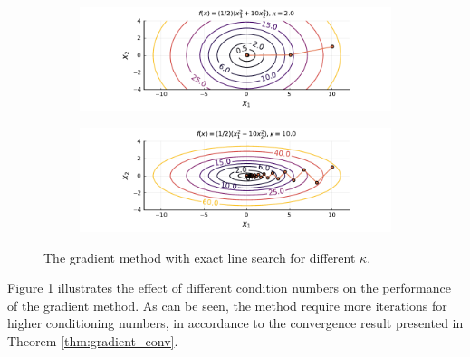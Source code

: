 \begin{figure}[h]
\begin{subfigure}[b]{\textwidth}
    \centering
   \includegraphics[width=\textwidth]{part_2/chapter_6/figures/gradient_k2.pdf}
\end{subfigure}
\hfill
\begin{subfigure}[b]{\textwidth}
    \centering
   \includegraphics[width=\textwidth]{part_2/chapter_6/figures/gradient_k10.pdf}
\end{subfigure}
\caption{The gradient method with exact line search for different $\kappa$.}\label{fig:figure_5}
\end{figure}



Figure \ref{fig:figure_5} illustrates the effect of different condition numbers on the performance of the gradient method. As can be seen, the method require more iterations for higher conditioning numbers, in accordance to the convergence result presented in Theorem \ref{thm:gradient_conv}.

